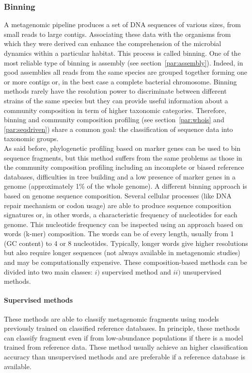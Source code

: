 \subsubsection{Binning}
A metagenomic pipeline produces a set of DNA sequences of various sizes, from small reads to large contigs. Associating these data with the organisms from which they were derived can enhance the comprehension of the microbial dynamics within a particular habitat. This process is called binning. One of the most reliable type of binning is assembly (see section~\ref{par:assembly}). Indeed, in good assemblies all reads from the same species are grouped together forming one or more contigs or, in the best case a complete bacterial chromosome. Binning methods rarely have the resolution power to discriminate between different strains of the same species but they can provide useful information about a community composition in term of higher taxonomic categories. Therefore, binning and community composition profiling (see section~\ref{par:whois} and \ref{par:seqdriven}) share a common goal: the classification of sequence data into taxonomic groups.\\
As said before, phylogenetic profiling based on marker genes can be used to bin sequence fragments, but this method suffers from the same problems as those in the community composition profiling including an incomplete or biased reference databases, difficulties in tree building and a low presence of marker genes in a genome (approximately 1\% of the whole genome). A different binning approach is based on genome sequence composition. Several cellular processes (like DNA repair mechanism or codon usage) are able to produce sequence composition signatures or, in other words, a characteristic frequency of nucleotides for each genome. This nucleotide frequency can be inspected using an approach based on words (k-mer) composition. The words can be of every length, usually from 1 (GC content) to 4 or 8 nucleotides. Typically, longer words give higher resolutions but also require longer sequences (not always available in metagenomic studies) and may be computationally expensive. These composition-based methods can be divided into two main classes: $i)$ supervised method and $ii)$ unsupervised methods.\\

\paragraph{Supervised methods}
These methods are able to classify metagenomic fragments using models previously trained on classified reference databases. In principle, these methods can classify fragment even if from low-abundance populations if there is a model trained from reference data. These method usually achieve an higher classification accuracy than unsupervised methods and are preferable if a reference database is available.

